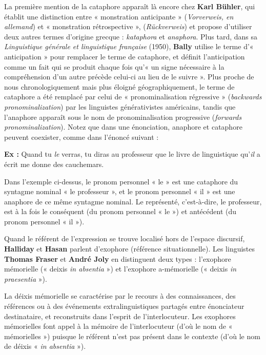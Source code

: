 La première mention de la cataphore apparaît là encore chez \textbf{Karl Bühler}, qui établit une distinction entre « monstration anticipante » (\textit{Vorverweis, en allemand}) et « monstration rétrospective », (\textit{Rückverweis}) et propose d’utiliser deux autres termes d’origine grecque : \textit{kataphora} et \textit{anaphora}. Plus tard, dans sa \textit{Linguistique générale et linguistique française} (1950), \textbf{Bally} utilise le terme d’« anticipation » pour remplacer le terme de cataphore, et définit l’anticipation comme un fait qui se produit chaque fois qu’« un signe nécessaire à la compréhension d’un autre précède celui-ci au lieu de le suivre ». Plus proche de nous chronologiquement mais plus éloigné géographiquement, le terme de cataphore a été remplacé par celui de « pronominalisation régressive » (\textit{backwards pronominalization}) par les linguistes générativistes américains, tandis que l’anaphore apparaît sous le nom de pronominalisation progressive (\textit{forwards pronominalization}). Notez que dans une énonciation, anaphore et cataphore peuvent coexister, comme dans l’énoncé suivant :

\textbf{Ex :} Quand tu \textit{le} verras, tu diras au professeur que le livre de linguistique qu’\textit{il} a écrit me donne des cauchemars.

Dans l’exemple ci-dessus, le pronom personnel « le » est une cataphore du syntagme nominal « le professeur », et le pronom personnel « il » est une anaphore de ce même syntagme nominal. Le représenté, c’est-à-dire, le professeur, est à la fois le conséquent (du pronom personnel « le ») et antécédent (du pronom personnel « il »).

Quand le référent de l’expression se trouve localisé hors de l’espace discursif, \textbf{Halliday} et \textbf{Hasan} parlent d’exophore (référence situationnelle). Les linguistes \textbf{Thomas Fraser} et \textbf{André Joly} en distinguent deux types : l’exophore mémorielle (« deixis \textit{in absentia} ») et l’exophore a-mémorielle (« deixis \textit{in praesentia} »).

La déixis mémorielle se caractérise par le recours à des connaissances, des références ou à des événements extralinguistiques partagés entre énonciateur destinataire, et reconstruits dans l’esprit de l’interlocuteur. Les exophores mémorielles font appel à la mémoire de l’interlocuteur (d’où le nom de « mémorielles ») puisque le référent n’est pas présent dans le contexte (d’où le nom de déixis « \textit{in absentia} »).

